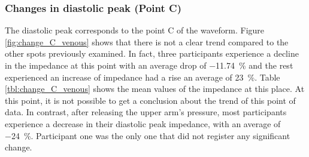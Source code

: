 \subsubsection{Changes in diastolic peak (Point C)}
\label{section results 3.1.3}
The diastolic peak corresponds to the point C of the waveform. Figure \ref{fig:change_C_venous} shows that there is not a clear trend compared to the other spots previously examined. In fact, three participants experience a decline in the impedance at this point with an average drop of \SI{-11.74}{\percent} and the rest experienced an increase of impedance had a rise an average of \SI{23}{\percent}. Table \ref{tbl:change_C_venous} shows the mean values of the impedance at this place. At this point, it is not possible to get a conclusion about the trend of this point of data. In contrast, after releasing the upper arm's pressure, most participants experience a decrease in their diastolic peak impedance, with an average of \SI{-24}{\percent}. Participant one was the only one that did not register any significant change. 

